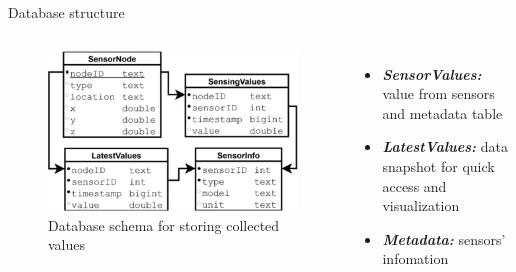 \documentclass[aspectratio=169]{beamer}
\begin{document}
\begin{frame}{Database structure}
    \begin{columns}
        \begin{figure}
            \includegraphics[scale=0.27]{pic/data-scheme.png}
            \caption{\footnotesize Database schema for storing collected values}
        \end{figure}

        \small{\begin{itemize}[label=$\circ$]
            \item \textit{\textbf{SensorValues:}} value from sensors and metadata table
            \item \textit{\textbf{LatestValues:}} data snapshot for quick access and visualization
            \item \textit{\textbf{Metadata:}} sensors' infomation
        \end{itemize}
        }
    \end{columns}
\end{frame}
\end{document}
